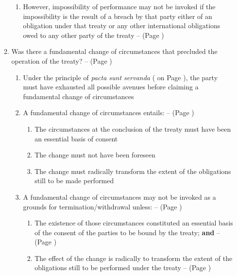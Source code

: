 \begin{enumerate}
\begin{enumerate}[resume]
\begin{enumerate}
            \item However, impossibility of performance may not be invoked if the impossibility is the result of a breach by that party either of an obligation under that treaty or any other international obligations owed to any other party of the treaty --  (Page \pageref{VCLT Art 61})
        \end{enumerate}
        \item Was there a fundamental change of circumstances that precluded the operation of the treaty? --  (Page \pageref{VCLT Art 62})
        \begin{enumerate}
            \item Under the principle of \textit{pacta sunt servanda} ( on Page \pageref{VCLT Art 26}), the party must have exhausted all possible avenues before claiming a fundamental change of circumstances
            \item A fundamental change of circumstances entails: --  (Page \pageref{case:[1997] ICJ Rep 7})
            \begin{enumerate}
                \item The circumstances at the conclusion of the treaty must have been an essential basis of consent
                \item The change must not have been foreseen
                \item The change must radically transform the extent of the obligations still to be made performed                
            \end{enumerate}
            \item A fundamental change of circumstances may not be invoked as a grounds for termination/withdrawal unless: --  (Page \pageref{VCLT Art 62})
            \begin{enumerate}
                \item The existence of those circumstances constituted an essential basis of the consent of the parties to be bound by the treaty; \textbf{and} --  (Page \pageref{VCLT Art 62})
                \item The effect of the change is radically to transform the extent of the obligations still to be performed under the treaty --  (Page \pageref{VCLT Art 62})
            \end{enumerate}

\end{enumerate}
\end{enumerate}
\end{enumerate}
